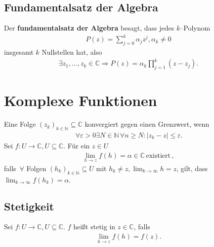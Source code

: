 \documentclass[a4paper,12pt]{article}
\numberwithin{equation}{section}
\begin{document}
\subsection{Fundamentalsatz der Algebra}
Der \textbf{fundamentalsatz der Algebra} besagt, dass jedes $k$--Polynom 
\begin{align} 
        P\left(z\right)=\sum_{j=0}^{k}\alpha _jz^j,\alpha _k\neq 0
\end{align} 
insgesamt $k$ Nullstellen hat, also
\begin{align} 
        \exists z_1,\hdots ,z_k \in \mathbb{C}\Rightarrow P\left(z\right)=\alpha _k\prod_{j=1}^{k}\left(z-z_j\right)
.\end{align} 

\newpage
\section{Komplexe Funktionen}
Eine Folge $\left(z_k\right)_{k \in \mathbb{N}}\subseteq \mathbb{C}$ konvergiert gegen einen Grenzwert, wenn
\begin{align} 
        \,\forall \varepsilon >0\exists N \in \mathbb{N}\,\forall n\geq N:|z_k-z|\leq \varepsilon 
.\end{align} 
Sei $f:U\rightarrow \mathbb{C},U\subseteq \mathbb{C}$. Für ein $z \in U$
\begin{align} 
        \lim_{h\rightarrow z}f\left(h\right)=\alpha  \in \mathbb{C}\,\text{existiert}\,
,\end{align} 
falls $\,\forall $ Folgen $\left(h_k\right)_{k \in \mathbb{N}} \subseteq U$ mit $h_k\neq z,\lim_{k\rightarrow \infty}h=z$, gilt, dass $\lim_{k\rightarrow \infty}f\left(h_k\right)=\alpha $.

\subsection{Stetigkeit}
Sei $f:U\rightarrow \mathbb{C},U\subseteq \mathbb{C}$. $f$ heißt stetig in $z \in \mathbb{C}$, falls
\begin{align} 
        \lim_{h\rightarrow z}f\left(h\right)=f\left(z\right)
.\end{align} 
\end{document}
